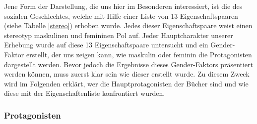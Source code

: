 Jene Form der Darstellung, die uns hier im Besonderen interessiert, ist
die des sozialen Geschlechtes, welche mit Hilfe einer Liste von 13
Eigenschaftspaaren (siehe Tabelle \ref{stereo}) erhoben wurde. Jedes
dieser Eigenschaftspaare weist einen stereotyp maskulinen und femininen
Pol auf. Jeder Hauptcharakter unserer Erhebung wurde auf diese 13
Eigenschaftspaare untersucht und ein Gender-Faktor erstellt, der uns
zeigen kann, wie maskulin oder feminin die Protagonisten dargestellt
werden. Bevor jedoch die Ergebnisse dieses Gender-Faktors präsentiert
werden können, muss zuerst klar sein wie dieser erstellt wurde. Zu
diesem Zweck wird im Folgenden erklärt, wer die Hauptprotagonisten der
Bücher sind und wie diese mit der Eigenschaftenliste konfrontiert
wurden.

\subsubsection{Protagonisten}

